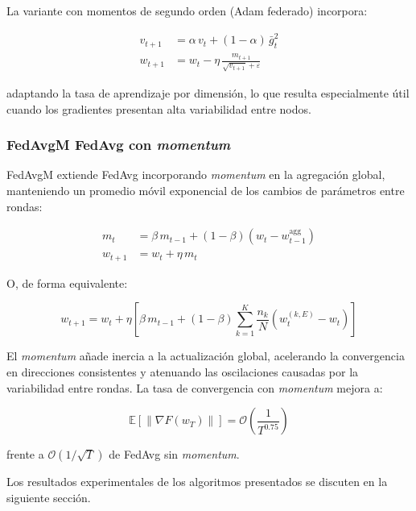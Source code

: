 La variante con momentos de segundo orden (Adam federado) incorpora:
 
\begin{align}
    v_{t+1}  &= \alpha\, v_t + (1-\alpha)\,\bar{g}_t^2 \\
    w_{t+1}  &= w_t - \eta\,\frac{m_{t+1}}{\sqrt{v_{t+1}} + \varepsilon}
\end{align}
 
adaptando la tasa de aprendizaje por dimensión, lo que resulta especialmente útil
cuando los gradientes presentan alta variabilidad entre nodos.
 
\subsubsection{FedAvgM  FedAvg con \textit{momentum}}
 
FedAvgM extiende FedAvg incorporando \textit{momentum} en la agregación global, manteniendo
un promedio móvil exponencial de los cambios de parámetros entre rondas:
 
\begin{align}
    m_t      &= \beta\, m_{t-1} + (1-\beta)\left(w_t - w_{t-1}^{\mathrm{agg}}\right) \\
    w_{t+1}  &= w_t + \eta\, m_t
\end{align}
 
O, de forma equivalente:
 
\begin{equation}
    w_{t+1} = w_t + \eta\left[
        \beta\, m_{t-1} + (1-\beta) \sum_{k=1}^{K} \frac{n_k}{N}
        \left(w_t^{(k,E)} - w_t\right)
    \right]
\end{equation}
 
El \textit{momentum} añade inercia a la actualización global, acelerando la convergencia
en direcciones consistentes y atenuando las oscilaciones causadas por la variabilidad entre
rondas. La tasa de convergencia con \textit{momentum} mejora a:
 
\[
\mathbb{E}\!\left[\|\nabla F(w_T)\|\right] =
    \mathcal{O}\!\left(\frac{1}{T^{0.75}}\right)
\]
 
frente a $\mathcal{O}(1/\sqrt{T})$ de FedAvg sin \textit{momentum}.
 
Los resultados experimentales de los algoritmos presentados se discuten en la siguiente
sección.